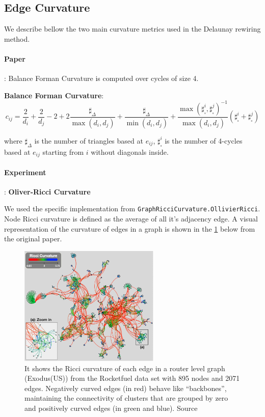 \documentclass{article}
\theoremstyle{plain}
\theoremstyle{definition}
\theoremstyle{remark}
\begin{document}
\subsection{Edge Curvature}
\label{app:curvature}
We describe bellow the two main curvature metrics used in the Delaunay rewiring method.
\paragraph{Paper}: 
Balance Forman Curvature \cite{topping2022understandingoversquashingbottlenecksgraphs} 
is computed over cycles of size 4.
    
\textbf{Balance Forman Curvature}:
    $$c_{ij}= \frac{2}{d_i} + \frac{2}{d_j} - 2 + 2 \frac{\sharp_{\Delta}}{\max(d_i, d_j)} + 
            \frac{\sharp_{\Delta}}{\min(d_i, d_j)} + 
            \frac{\max(\sharp_{\square}^i,\sharp_{\square}^j)^{-1}}{\max(d_i, d_j)}
            (\sharp_{\square}^i + \sharp_{\square}^j)
    $$

    where $\sharp_{\Delta}$ is the number of triangles based at $e_{ij}$, 
    $\sharp_{\square}^i$ is the number of 4-cycles based at $e_{ij}$ starting from $i$
    without diagonals inside.


\paragraph{Experiment}: 
\textbf{Oliver-Ricci Curvature} \cite{ni2015riccicurvatureinternettopology} 

We used the specific implementation from \texttt{GraphRicciCurvature.OllivierRicci}. 
Node Ricci curvature is defined as the average of all it’s adjacency edge. A visual
representation of the curvature of edges in a graph is shown in the \ref{fig:ricci_edge_curvature} below 
from the original paper.
\begin{figure}[ht!]
    \center
    \includegraphics[width=0.6\textwidth]{figures/Riccicurvature.png}
    \caption{ It shows the Ricci curvature of each edge in a router level graph
    (Exodus(US)) from the Rocketfuel data set with 895 nodes and 2071
    edges. Negatively curved edges (in red) behave like “backbones”,
    maintaining the connectivity of clusters that are grouped by zero and
    positively curved edges (in green and blue). Source \cite{ni2015riccicurvatureinternettopology}}
    \label{fig:ricci_edge_curvature}
\end{figure}
\end{document}
